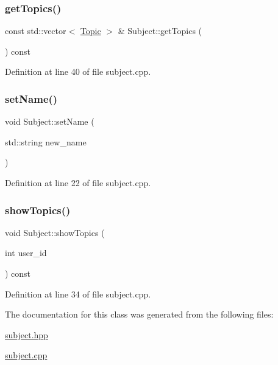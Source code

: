 \subsubsection{\texorpdfstring{get\+Topics()}{getTopics()}}
{\footnotesize\ttfamily const std\+::vector$<$ \hyperlink{class_topic}{Topic} $>$ \& Subject\+::get\+Topics (\begin{DoxyParamCaption}{ }\end{DoxyParamCaption}) const}



Definition at line 40 of file subject.\+cpp.

\mbox{\label{class_subject_a9d3ec013f7c71f428f1118257785f890}} 
\subsubsection{\texorpdfstring{set\+Name()}{setName()}}
{\footnotesize\ttfamily void Subject\+::set\+Name (\begin{DoxyParamCaption}\item[{std\+::string}]{new\+\_\+name }\end{DoxyParamCaption})}



Definition at line 22 of file subject.\+cpp.

\mbox{\label{class_subject_ab9f2b4494496feb662d69aac64e5e61c}} 
\subsubsection{\texorpdfstring{show\+Topics()}{showTopics()}}
{\footnotesize\ttfamily void Subject\+::show\+Topics (\begin{DoxyParamCaption}\item[{int}]{user\+\_\+id }\end{DoxyParamCaption}) const}



Definition at line 34 of file subject.\+cpp.



The documentation for this class was generated from the following files\+:\begin{DoxyCompactItemize}
\item 
\hyperlink{subject_8hpp}{subject.\+hpp}\item 
\hyperlink{subject_8cpp}{subject.\+cpp}\end{DoxyCompactItemize}
